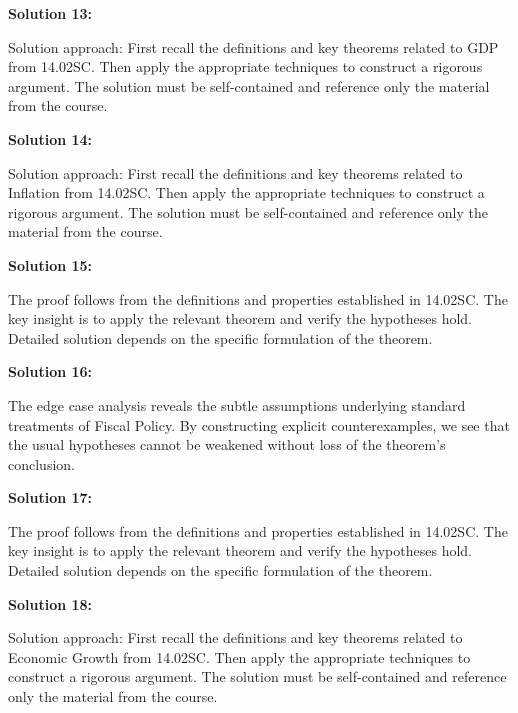 \documentclass[12pt,a4paper]{exam}
\begin{document}
\vspace{0.5cm}

\textbf{Solution 13:}

Solution approach: First recall the definitions and key theorems related to GDP from 14.02SC. Then apply the appropriate techniques to construct a rigorous argument. The solution must be self-contained and reference only the material from the course.

\vspace{0.5cm}

\textbf{Solution 14:}

Solution approach: First recall the definitions and key theorems related to Inflation from 14.02SC. Then apply the appropriate techniques to construct a rigorous argument. The solution must be self-contained and reference only the material from the course.

\vspace{0.5cm}

\textbf{Solution 15:}

The proof follows from the definitions and properties established in 14.02SC. The key insight is to apply the relevant theorem and verify the hypotheses hold. Detailed solution depends on the specific formulation of the theorem.

\vspace{0.5cm}

\textbf{Solution 16:}

The edge case analysis reveals the subtle assumptions underlying standard treatments of Fiscal Policy. By constructing explicit counterexamples, we see that the usual hypotheses cannot be weakened without loss of the theorem's conclusion.

\vspace{0.5cm}

\textbf{Solution 17:}

The proof follows from the definitions and properties established in 14.02SC. The key insight is to apply the relevant theorem and verify the hypotheses hold. Detailed solution depends on the specific formulation of the theorem.

\vspace{0.5cm}

\textbf{Solution 18:}

Solution approach: First recall the definitions and key theorems related to Economic Growth from 14.02SC. Then apply the appropriate techniques to construct a rigorous argument. The solution must be self-contained and reference only the material from the course.
\end{document}
